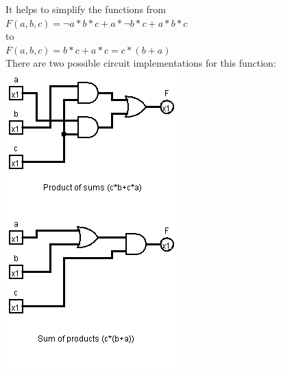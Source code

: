 \documentclass{scrartcl}
\begin{document}
\begin{Large}
It helps to simplify the functions from\\

$F(a, b, c)= \neg a * b * c + a * \neg b * c + a * b * c$\\

to\\

$F(a, b, c)= b * c + a * c = c * (b + a)$\\

There are two possible circuit implementations for this function:\\

\includegraphics[scale=0.65]{Circuits.png}
\end{Large}
\end{document}
